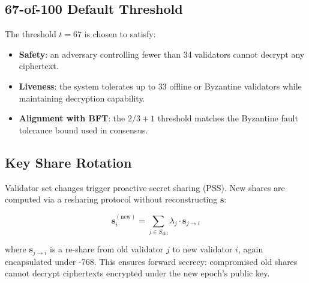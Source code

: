 \subsection{67-of-100 Default Threshold}

The threshold $t = 67$ is chosen to satisfy:

\begin{itemize}
  \item \textbf{Safety}: an adversary controlling fewer than 34 validators cannot decrypt any ciphertext.
  \item \textbf{Liveness}: the system tolerates up to 33 offline or Byzantine validators while maintaining decryption capability.
  \item \textbf{Alignment with BFT}: the $2/3 + 1$ threshold matches the Byzantine fault tolerance bound used in \Zoo{} \TChain{} consensus.
\end{itemize}

\subsection{Key Share Rotation}

Validator set changes trigger proactive secret sharing (PSS). New shares are computed via a resharing protocol without reconstructing $\mathbf{s}$:

\begin{equation}
  \mathbf{s}_i^{(\mathrm{new})} = \sum_{j \in S_{\mathrm{old}}} \lambda_j \cdot \mathbf{s}_{j \to i}
\end{equation}

\noindent where $\mathbf{s}_{j \to i}$ is a re-share from old validator $j$ to new validator $i$, again encapsulated under \MLKEM{}-768. This ensures forward secrecy: compromised old shares cannot decrypt ciphertexts encrypted under the new epoch's public key.

